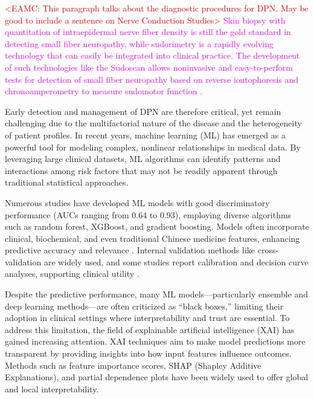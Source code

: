 \documentclass[fleqn,10pt]{wlscirep}
\begin{document}
\textcolor{red}{<EAMC: This paragraph talks about the diagnostic procedures for DPN. May be good to include a sentence on Nerve Conduction Studies>} \textcolor{magenta}{Skin biopsy with quantitation of intraepidermal nerve fiber density is still the gold standard in detecting small fiber neuropathy, while sudorimetry is a rapidly evolving technology that can easily be integrated into clinical practice. The development of such technologies like the Sudoscan allows noninvasive and easy-to-perform tests for detection of small fiber neuropathy based on reverse iontophoresis and chronoamperometry to measure sudomotor function \cite{mayaudon:2010newsimple, vinik2015newage}.
}

Early detection and management of DPN are therefore critical, yet remain challenging due to the multifactorial nature of the disease and the heterogeneity of patient profiles. In recent years, machine learning (ML) has emerged as a powerful tool for modeling complex, nonlinear relationships in medical data. By leveraging large clinical datasets, ML algorithms can identify patterns and interactions among risk factors that may not be readily apparent through traditional statistical approaches. 

Numerous studies have developed ML models with good discriminatory performance (AUCs ranging from 0.64 to 0.93), employing diverse algorithms such as random forest, XGBoost, and gradient boosting. Models often incorporate clinical, biochemical, and even traditional Chinese medicine features, enhancing predictive accuracy and relevance \cite{ma2025machine,jiang2024multifeature,cui2023study,lian2023Study,Wei2024construction}. Internal validation methods like cross-validation are widely used, and some studies report calibration and decision curve analyses, supporting clinical utility \cite{cui2023study}.

Despite the  predictive performance, many ML models—particularly ensemble and deep learning methods—are often criticized as “black boxes,” limiting their adoption in clinical settings where interpretability and trust are essential. To address this limitation, the field of explainable artificial intelligence (XAI) has gained increasing attention. XAI techniques aim to make model predictions more transparent by providing insights into how input features influence outcomes. Methods such as feature importance scores, SHAP (Shapley Additive Explanations), and partial dependence plots have been widely used to offer global and local interpretability. 
\end{document}
